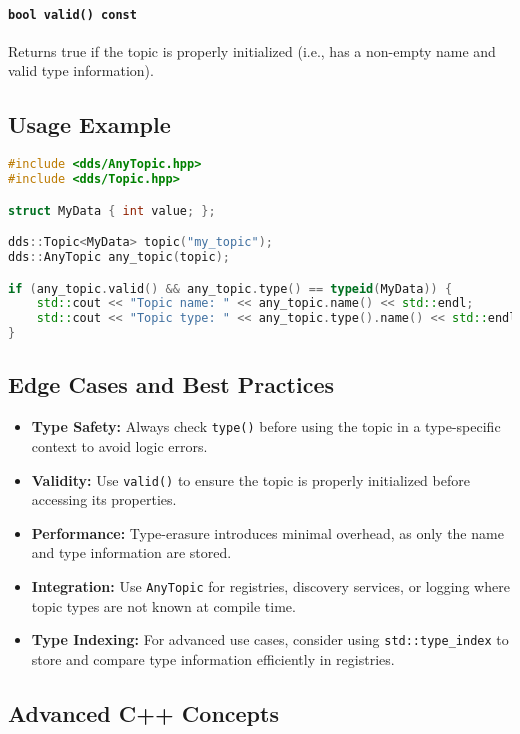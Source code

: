 \documentclass[12pt]{report}
\begin{document}
\paragraph{\texttt{bool valid() const}}
Returns true if the topic is properly initialized (i.e., has a non-empty name and valid type information).

\subsection{Usage Example}
\begin{lstlisting}[language=C++]
#include <dds/AnyTopic.hpp>
#include <dds/Topic.hpp>

struct MyData { int value; };

dds::Topic<MyData> topic("my_topic");
dds::AnyTopic any_topic(topic);

if (any_topic.valid() && any_topic.type() == typeid(MyData)) {
    std::cout << "Topic name: " << any_topic.name() << std::endl;
    std::cout << "Topic type: " << any_topic.type().name() << std::endl;
}
\end{lstlisting}

\subsection{Edge Cases and Best Practices}
\begin{itemize}
    \item \textbf{Type Safety:} Always check \texttt{type()} before using the topic in a type-specific context to avoid logic errors.
    \item \textbf{Validity:} Use \texttt{valid()} to ensure the topic is properly initialized before accessing its properties.
    \item \textbf{Performance:} Type-erasure introduces minimal overhead, as only the name and type information are stored.
    \item \textbf{Integration:} Use \texttt{AnyTopic} for registries, discovery services, or logging where topic types are not known at compile time.
    \item \textbf{Type Indexing:} For advanced use cases, consider using \texttt{std::type\_index} to store and compare type information efficiently in registries.
\end{itemize}

\subsection{Advanced C++ Concepts}
\end{document}
